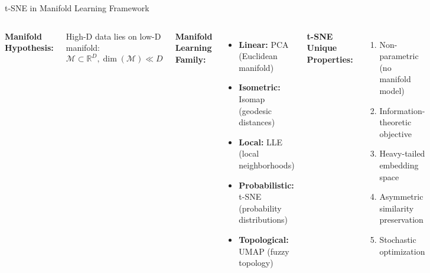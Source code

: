 \documentclass[aspectratio=169]{beamer}
\begin{document}
\begin{frame}{t-SNE in Manifold Learning Framework}
\begin{columns}
\textbf{Manifold Hypothesis:}

High-D data lies on low-D manifold:
  $\mathcal{M} \subset \mathbb{R}^D, \dim(\mathcal{M}) \ll D$
  
  \textbf{Manifold Learning Family:}

\begin{itemize}
\item \textbf{Linear:} PCA (Euclidean manifold)
\item \textbf{Isometric:} Isomap (geodesic distances)
\item \textbf{Local:} LLE (local neighborhoods)
\item \textbf{Probabilistic:} t-SNE (probability distributions)
\item \textbf{Topological:} UMAP (fuzzy topology)
\end{itemize}

\textbf{t-SNE Unique Properties:}

\begin{enumerate}
\item Non-parametric (no manifold model)
\item Information-theoretic objective
\item Heavy-tailed embedding space
\item Asymmetric similarity preservation
\item Stochastic optimization
\end{enumerate}

\end{columns}
\end{frame}
\end{document}
